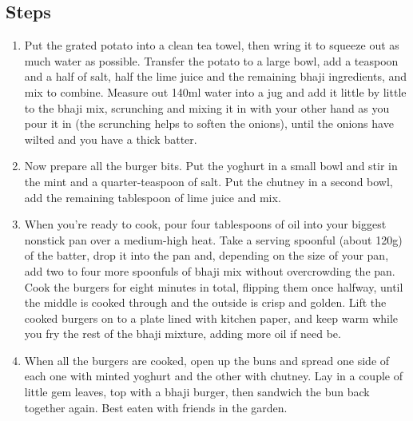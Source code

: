 \documentclass{book}
\begin{document}
\subsection*{Steps}
\begin{enumerate}
\item Put the grated potato into a clean tea towel, then wring it to squeeze out as much water as possible. Transfer the potato to a large bowl, add a teaspoon and a half of salt, half the lime juice and the remaining bhaji ingredients, and mix to combine. Measure out 140ml water into a jug and add it little by little to the bhaji mix, scrunching and mixing it in with your other hand as you pour it in (the scrunching helps to soften the onions), until the onions have wilted and you have a thick batter.
\item Now prepare all the burger bits. Put the yoghurt in a small bowl and stir in the mint and a quarter-teaspoon of salt. Put the chutney in a second bowl, add the remaining tablespoon of lime juice and mix.
\item When you’re ready to cook, pour four tablespoons of oil into your biggest nonstick pan over a medium-high heat. Take a serving spoonful (about 120g) of the batter, drop it into the pan and, depending on the size of your pan, add two to four more spoonfuls of bhaji mix without overcrowding the pan. Cook the burgers for eight minutes in total, flipping them once halfway, until the middle is cooked through and the outside is crisp and golden. Lift the cooked burgers on to a plate lined with kitchen paper, and keep warm while you fry the rest of the bhaji mixture, adding more oil if need be.
\item When all the burgers are cooked, open up the buns and spread one side of each one with minted yoghurt and the other with chutney. Lay in a couple of little gem leaves, top with a bhaji burger, then sandwich the bun back together again. Best eaten with friends in the garden.
\end{enumerate}
\newpage
\end{document}
